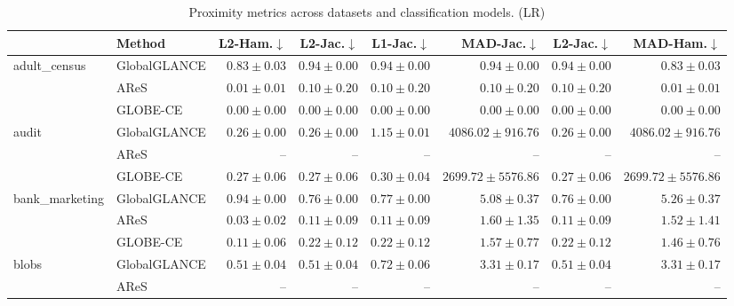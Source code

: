 \begin{table}[ht]
\centering
\caption{Proximity metrics across datasets and classification models. (LR)}
\label{tab:proximity_metrics_multinomiallogisticregression}
\begin{center}
\begin{sc}
\begin{scriptsize}
\begin{tabular}{l|l|rrrrrr}
\toprule
 & Method & L2-Ham.$\downarrow$ & L2-Jac.$\downarrow$ & L1-Jac.$\downarrow$ & MAD-Jac.$\downarrow$ & L2-Jac.$\downarrow$ & MAD-Ham.$\downarrow$ \\
\midrule
\multirow{3}{*}{adult\_census} & GlobalGLANCE & $0.83\pm{0.03}$ & $0.94\pm{0.00}$ & $0.94\pm{0.00}$ & $0.94\pm{0.00}$ & $0.94\pm{0.00}$ & $0.83\pm{0.03}$ \\
 & AReS & $0.01\pm{0.01}$ & $0.10\pm{0.20}$ & $0.10\pm{0.20}$ & $0.10\pm{0.20}$ & $0.10\pm{0.20}$ & $0.01\pm{0.01}$ \\
 & GLOBE-CE & $\boldsymbol{0.00\pm{0.00}}$ & $\boldsymbol{0.00\pm{0.00}}$ & $\boldsymbol{0.00\pm{0.00}}$ & $\boldsymbol{0.00\pm{0.00}}$ & $\boldsymbol{0.00\pm{0.00}}$ & $\boldsymbol{0.00\pm{0.00}}$ \\
\midrule
\multirow{3}{*}{audit} & GlobalGLANCE & $\boldsymbol{0.26\pm{0.00}}$ & $\boldsymbol{0.26\pm{0.00}}$ & $1.15\pm{0.01}$ & $4086.02\pm{916.76}$ & $\boldsymbol{0.26\pm{0.00}}$ & $4086.02\pm{916.76}$ \\
 & AReS & -- & -- & -- & -- & -- & -- \\
 & GLOBE-CE & $0.27\pm{0.06}$ & $0.27\pm{0.06}$ & $\boldsymbol{0.30\pm{0.04}}$ & $\boldsymbol{2699.72\pm{5576.86}}$ & $0.27\pm{0.06}$ & $\boldsymbol{2699.72\pm{5576.86}}$ \\
\midrule
\multirow{3}{*}{bank\_marketing} & GlobalGLANCE & $0.94\pm{0.00}$ & $0.76\pm{0.00}$ & $0.77\pm{0.00}$ & $5.08\pm{0.37}$ & $0.76\pm{0.00}$ & $5.26\pm{0.37}$ \\
 & AReS & $\boldsymbol{0.03\pm{0.02}}$ & $\boldsymbol{0.11\pm{0.09}}$ & $\boldsymbol{0.11\pm{0.09}}$ & $1.60\pm{1.35}$ & $\boldsymbol{0.11\pm{0.09}}$ & $1.52\pm{1.41}$ \\
 & GLOBE-CE & $0.11\pm{0.06}$ & $0.22\pm{0.12}$ & $0.22\pm{0.12}$ & $\boldsymbol{1.57\pm{0.77}}$ & $0.22\pm{0.12}$ & $\boldsymbol{1.46\pm{0.76}}$ \\
\midrule
\multirow{3}{*}{blobs} & GlobalGLANCE & $0.51\pm{0.04}$ & $0.51\pm{0.04}$ & $0.72\pm{0.06}$ & $3.31\pm{0.17}$ & $0.51\pm{0.04}$ & $3.31\pm{0.17}$ \\
 & AReS & -- & -- & -- & -- & -- & -- \\

\end{tabular}
\end{scriptsize}
\end{sc}
\end{center}
\end{table}
